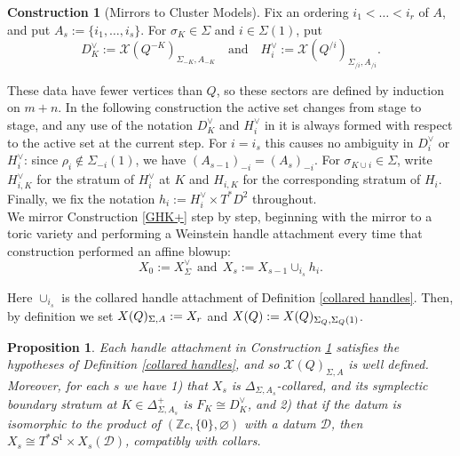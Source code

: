 \documentclass[11pt]{amsart}
\newtheorem{prop}[thm]{Proposition}
\theoremstyle{definition}
\newtheorem{con}[thm]{Construction}
\theoremstyle{remark}
\newcommand{\X}{\mathcal{X}}
\renewcommand{\emptyset}{\varnothing}
\numberwithin{equation}{section}
\begin{document}
 \begin{con}[Mirrors to Cluster Models]\label{cluster mirrors} Fix an ordering $i_1<\dots<i_r$ of $A$, and put $A_s:=\{i_1,\dots,i_s\}$. For $\sigma_K\in\Sigma$ and $i\in\Sigma(1)$, put $$D_K^\vee:=\mathcal X(Q^{-K})_{\Sigma_{-K},A_{-K}} \quad \text{and} \quad H_i^\vee:=\mathcal X(Q^{/i})_{\Sigma_{/i},A_{/i}} .$$

These data have fewer vertices than $Q$, so these sectors are defined by induction on $m+n$. In the following construction the active set changes from stage to stage, and any use of the notation $D_K^\vee$ and $H_i^\vee$ in it is always formed with respect to the active set at the current step. For $i=i_s$ this causes no ambiguity in $D_i^\vee$ or $H_i^\vee$: since $\rho_i\notin\Sigma_{-i}(1)$, we have $(A_{s-1})_{-i}=(A_s)_{-i}$. For $\sigma_{K\cup i}\in\Sigma$, write $H^\vee_{i,K}$ for the stratum of $H_i^\vee$ at $K$ and $H_{i,K}$ for the corresponding stratum of $H_i$. Finally, we fix the notation $h_i := H^\vee_i \times T^* D^2$ throughout.\\

We mirror Construction \ref{GHK+} step by step, beginning with the mirror to a toric variety and performing a Weinstein handle attachment every time that construction performed an affine blowup:
$$X_0 := X_\Sigma^\vee \:\: \text{and} \:\:X_s :=X_{s-1}\cup_{i_s} h_i.$$

Here $\cup_{i_s}$ is the collared handle attachment of Definition \ref{collared handles}. Then, by definition we set $\mathcal \X(Q)_{\Sigma,A}:=X_r$ and $\mathcal \X(Q):=\mathcal \X(Q)_{\Sigma_Q,\Sigma_Q(1)}$.
\end{con}

\begin{prop}\label{A-side product splitting}
    Each handle attachment in Construction \ref{cluster mirrors} satisfies the hypotheses of Definition \ref{collared handles}, and so $\mathcal X(Q)_{\Sigma,A}$ is well defined. Moreover, for each $s$ we have 1) that $X_s$ is $\Delta_{\Sigma,A_s}$-collared, and its symplectic boundary stratum at $K\in\Delta^+_{\Sigma,A_s}$ is $F_K\cong D^\vee_K$, and 2) that if the datum is isomorphic to the product of $(\mathbb Zc,\{0\},\emptyset)$ with a datum $\mathcal D$, then $X_s\cong T^*S^1\times X_s(\mathcal D)$, compatibly with collars.
\end{prop}
\end{document}
